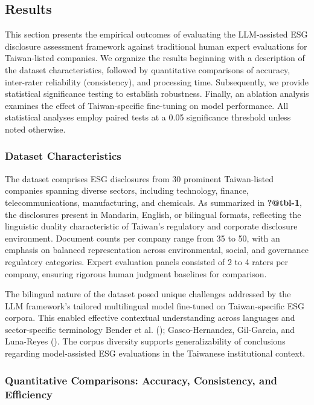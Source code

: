 \documentclass[
  12pt,
]{article}
\begin{document}
\subsection{Results}\label{results-1}

This section presents the empirical outcomes of evaluating the
LLM-assisted ESG disclosure assessment framework against traditional
human expert evaluations for Taiwan-listed companies. We organize the
results beginning with a description of the dataset characteristics,
followed by quantitative comparisons of accuracy, inter-rater
reliability (consistency), and processing time. Subsequently, we provide
statistical significance testing to establish robustness. Finally, an
ablation analysis examines the effect of Taiwan-specific fine-tuning on
model performance. All statistical analyses employ paired tests at a
0.05 significance threshold unless noted otherwise.

\subsubsection{Dataset Characteristics}\label{dataset-characteristics}

The dataset comprises ESG disclosures from 30 prominent Taiwan-listed
companies spanning diverse sectors, including technology, finance,
telecommunications, manufacturing, and chemicals. As summarized in
\textbf{?@tbl-1}, the disclosures present in Mandarin, English, or
bilingual formats, reflecting the linguistic duality characteristic of
Taiwan's regulatory and corporate disclosure environment. Document
counts per company range from 35 to 50, with an emphasis on balanced
representation across environmental, social, and governance regulatory
categories. Expert evaluation panels consisted of 2 to 4 raters per
company, ensuring rigorous human judgment baselines for comparison.

The bilingual nature of the dataset posed unique challenges addressed by
the LLM framework's tailored multilingual model fine-tuned on
Taiwan-specific ESG corpora. This enabled effective contextual
understanding across languages and sector-specific terminology Bender et
al. (); Gasco-Hernandez, Gil-Garcia, and
Luna-Reyes (). The corpus
diversity supports generalizability of conclusions regarding
model-assisted ESG evaluations in the Taiwanese institutional context.

\subsubsection{Quantitative Comparisons: Accuracy, Consistency, and
Efficiency}\label{quantitative-comparisons-accuracy-consistency-and-efficiency}
\end{document}
